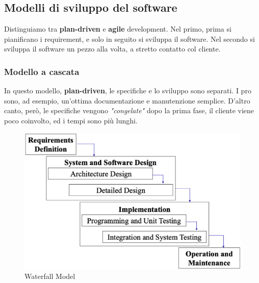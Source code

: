 \documentclass[11pt]{article}
\begin{document}
\subsection{Modelli di sviluppo del software}
Distinguiamo tra \textbf{plan-driven} e \textbf{agile} development. Nel primo, prima si pianificano i requirement, e solo in seguito si sviluppa il software. Nel secondo si sviluppa il software un pezzo alla volta, a stretto contatto col cliente. 
\subsubsection{Modello a cascata}
In questo modello, \textbf{plan-driven}, le specifiche e lo sviluppo sono separati. I pro sono, ad esempio, un'ottima documentazione e manutenzione semplice. D'altro canto, però, le specifiche vengono \textit{"congelate"} dopo la prima fase, il cliente viene poco coinvolto, ed i tempi sono più lunghi. 
\begin{figure}[H]
    \centering
    \includegraphics[width=\linewidth]{res/teoria/WaterfallModel.png}
    \caption{Waterfall Model}
\end{figure}
\end{document}
